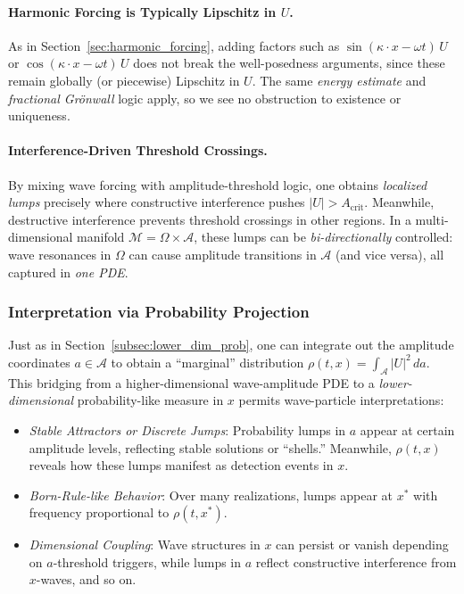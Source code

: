 \documentclass[12pt]{article}
\begin{document}
\paragraph{Harmonic Forcing is Typically Lipschitz in $U$.}
As in Section~\ref{sec:harmonic_forcing}, adding factors such as 
\(\sin(\kappa \cdot x - \omega t)\,U\) or 
\(\cos(\kappa \cdot x - \omega t)\,U\)
does not break the well-posedness arguments, since these remain globally (or piecewise) 
Lipschitz in $U$. The same \emph{energy estimate} and \emph{fractional Grönwall} logic 
apply, so we see no obstruction to existence or uniqueness.

\paragraph{Interference-Driven Threshold Crossings.}
By mixing wave forcing with amplitude-threshold logic, one obtains 
\emph{localized lumps} precisely where constructive interference pushes 
$|U|>A_{\mathrm{crit}}$. Meanwhile, destructive interference prevents threshold 
crossings in other regions. 
In a multi-dimensional manifold $\mathcal{M}=\Omega\times\mathcal{A}$, these lumps can 
be \emph{bi-directionally} controlled: wave resonances in $\Omega$ can cause amplitude 
transitions in $\mathcal{A}$ (and vice versa), all captured in \emph{one PDE}.

\subsubsection{Interpretation via Probability Projection}
\label{subsubsec:prob_projection}

Just as in Section~\ref{subsec:lower_dim_prob}, one can integrate out the amplitude 
coordinates $a\in\mathcal{A}$ to obtain a “marginal” distribution 
\(\rho(t,x)=\int_{\mathcal{A}}|U|^2\,da\). This bridging from a higher-dimensional 
wave-amplitude PDE to a \emph{lower-dimensional} probability-like measure in $x$ 
permits wave-particle interpretations:
\begin{itemize}
  \item \emph{Stable Attractors or Discrete Jumps}: 
        Probability lumps in $a$ appear at certain amplitude levels, reflecting 
        stable solutions or “shells.” Meanwhile, $\rho(t,x)$ reveals how these lumps 
        manifest as detection events in $x$. 
  \item \emph{Born-Rule-like Behavior}: 
        Over many realizations, lumps appear at $x^*$ with frequency proportional to 
        $\rho(t,x^*)$. 
  \item \emph{Dimensional Coupling}: 
        Wave structures in $x$ can persist or vanish depending on $a$-threshold triggers, 
        while lumps in $a$ reflect constructive interference from $x$-waves, and so on.
\end{itemize}
\end{document}
